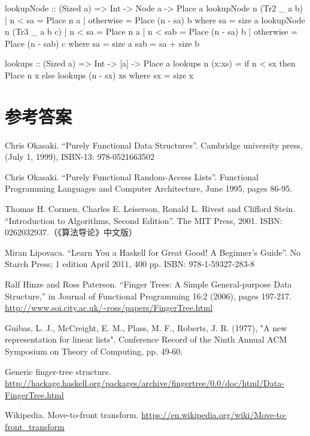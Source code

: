 \documentclass[b5paper]{ctexart}
\begin{document}
\begin{Haskell}
lookupNode :: (Sized a) => Int -> Node a -> Place a
lookupNode n (Tr2 _ a b) | n < sa = Place n a
                         | otherwise = Place (n - sa) b
  where sa = size a
lookupNode n (Tr3 _ a b c) | n < sa = Place n a
                           | n < sab = Place (n - sa) b
                           | otherwise = Place (n - sab) c
  where sa = size a
        sab = sa + size b

lookups :: (Sized a) => Int -> [a] -> Place a
lookups n (x:xs) = if n < sx then Place n x
                   else lookups (n - sx) xs
  where sx = size x
\end{Haskell}

\ifx\wholebook\relax \else
\section{参考答案}
\shipoutAnswer

\begin{thebibliography}{99}

Chris Okasaki. ``Purely Functional Data Structures''. Cambridge university press, (July 1, 1999), ISBN-13: 978-0521663502

Chris Okasaki. ``Purely Functional Random-Access Lists''. Functional Programming Languages and Computer Architecture, June 1995, pages 86-95.

Thomas H. Cormen, Charles E. Leiserson, Ronald L. Rivest and Clifford Stein. ``Introduction to Algorithms, Second Edition''. The MIT Press, 2001. ISBN: 0262032937.（《算法导论》中文版）

Miran Lipovaca. ``Learn You a Haskell for Great Good! A Beginner's Guide''. No Starch Press; 1 edition April 2011, 400 pp. ISBN: 978-1-59327-283-8

Ralf Hinze and Ross Paterson. ``Finger Trees: A Simple General-purpose Data Structure,'' in Journal of Functional Programming 16:2 (2006), pages 197-217. \url{http://www.soi.city.ac.uk/~ross/papers/FingerTree.html}

Guibas, L. J., McCreight, E. M., Plass, M. F., Roberts, J. R. (1977), "A new representation for linear lists". Conference Record of the Ninth Annual ACM Symposium on Theory of Computing, pp. 49-60.

Generic finger-tree structure. \url{http://hackage.haskell.org/packages/archive/fingertree/0.0/doc/html/Data-FingerTree.html}

Wikipedia. Move-to-front transform. \url{https://en.wikipedia.org/wiki/Move-to-front_transform}

\end{thebibliography}

\expandafter\enddocument
\fi
\end{document}

